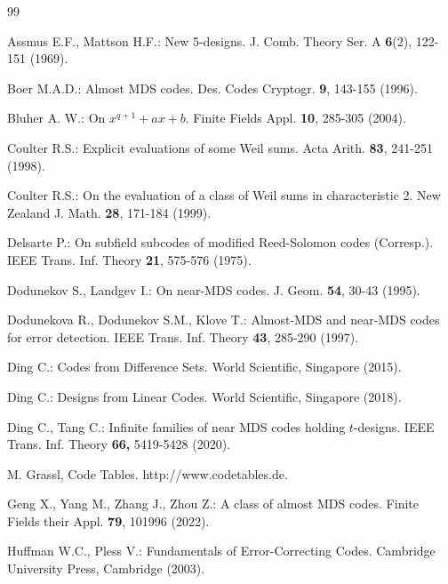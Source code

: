 \documentclass[sn-mathphys-num]{sn-jnl}%
\theoremstyle{thmstyleone}%
\theoremstyle{thmstyletwo}%
\theoremstyle{thmstylethree}%
\begin{document}
\begin{thebibliography}{99}
	
	 Assmus E.F., Mattson H.F.: New 5-designs. J. Comb. Theory Ser. A \textbf{6}(2), 122-151 (1969).
	
	 Boer M.A.D.: Almost MDS codes. Des. Codes Cryptogr. \textbf{9}, 143-155 (1996).
	
	 Bluher A. W.: On $x^{q+1}+ax+b$. Finite Fields Appl. \textbf{10}, 285-305 (2004).
	
	 Coulter R.S.: Explicit evaluations of some Weil sums. Acta Arith. \textbf{83}, 241-251 (1998).
	
	 Coulter R.S.: On the evaluation of a class of Weil sums in characteristic 2. New Zealand J. Math. \textbf{28}, 171-184 (1999).
	
	 Delsarte P.: On subfield subcodes of modified Reed-Solomon codes (Corresp.). IEEE Trans. Inf. Theory \textbf{21}, 575-576 (1975).
	
	 Dodunekov S., Landgev I.: On near-MDS codes. J. Geom. \textbf{54}, 30-43 (1995).
	
	 Dodunekova R., Dodunekov S.M., Klove T.: Almost-MDS and near-MDS codes for error detection. IEEE Trans. Inf. Theory \textbf{43}, 285-290 (1997).	
	
	 Ding C.: Codes from Difference Sets. World Scientific, Singapore (2015).
	
	 Ding C.: Designs from Linear Codes. World Scientific, Singapore (2018).
	
	 Ding C., Tang C.: Infinite families of near MDS codes holding $t$-designs. IEEE Trans. Inf. Theory \textbf{66,} 5419-5428 (2020).
	
	 M. Grassl, Code Tables. http://www.codetables.de.
	
	 Geng X., Yang M., Zhang J., Zhou Z.: A class of almost MDS codes. Finite Fields their Appl. \textbf{79}, 101996 (2022).
	
	 Huffman W.C., Pless V.: Fundamentals of Error-Correcting Codes. Cambridge University Press, Cambridge (2003).
	

\end{thebibliography}
\end{document}
